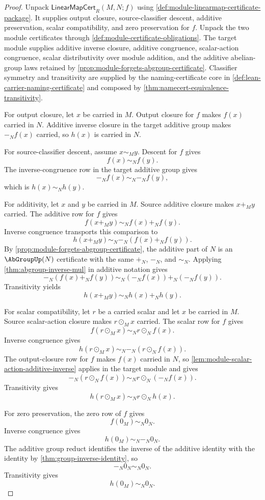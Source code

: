 \begin{proof}
Unpack $\mathsf{LinearMapCert}_R(M,N;f)$ using \autoref{def:module-linearmap-certificate-package}. It supplies output closure, source-classifier descent, additive preservation, scalar compatibility, and zero preservation for $f$. Unpack the two module certificates through \autoref{def:module-certificate-obligations}. The target module supplies additive inverse closure, additive congruence, scalar-action congruence, scalar distributivity over module addition, and the additive abelian-group laws retained by \autoref{prop:module-forgets-abgroup-certificate}. Classifier symmetry and transitivity are supplied by the naming-certificate core in \autoref{def:lean-carrier-naming-certificate} and composed by \autoref{thm:namecert-equivalence-transitivity}.

For output closure, let $x$ be carried in $M$. Output closure for $f$ makes $f(x)$ carried in $N$. Additive inverse closure in the target additive group makes $-_N f(x)$ carried, so $h(x)$ is carried in $N$.

For source-classifier descent, assume $x\sim_M y$. Descent for $f$ gives
$$
f(x)\sim_N f(y).
$$
The inverse-congruence row in the target additive group gives
$$
-_N f(x)\sim_N-_N f(y),
$$
which is $h(x)\sim_Nh(y)$.

For additivity, let $x$ and $y$ be carried in $M$. Source additive closure makes $x+_M y$ carried. The additive row for $f$ gives
$$
f(x+_M y)\sim_N f(x)+_N f(y).
$$
Inverse congruence transports this comparison to
$$
h(x+_M y)\sim_N-_N(f(x)+_N f(y)).
$$
By \autoref{prop:module-forgets-abgroup-certificate}, the additive part of $N$ is an $\AbGroupUp(N)$ certificate with the same $+_N$, $-_N$, and $\sim_N$. Applying \autoref{thm:abgroup-inverse-mul} in additive notation gives
$$
-_N(f(x)+_N f(y))\sim_N(-_N f(x))+_N(-_N f(y)).
$$
Transitivity yields
$$
h(x+_M y)\sim_N h(x)+_N h(y).
$$

For scalar compatibility, let $r$ be a carried scalar and let $x$ be carried in $M$. Source scalar-action closure makes $r\odot_M x$ carried. The scalar row for $f$ gives
$$
f(r\odot_M x)\sim_N r\odot_N f(x).
$$
Inverse congruence gives
$$
h(r\odot_M x)\sim_N-_N(r\odot_N f(x)).
$$
The output-closure row for $f$ makes $f(x)$ carried in $N$, so \autoref{lem:module-scalar-action-additive-inverse} applies in the target module and gives
$$
-_N(r\odot_N f(x))\sim_N r\odot_N(-_N f(x)).
$$
Transitivity gives
$$
h(r\odot_M x)\sim_N r\odot_N h(x).
$$

For zero preservation, the zero row of $f$ gives
$$
f(0_M)\sim_N0_N.
$$
Inverse congruence gives
$$
h(0_M)\sim_N-_N0_N.
$$
The additive group reduct identifies the inverse of the additive identity with the identity by \autoref{thm:group-inverse-identity}, so
$$
-_N0_N\sim_N0_N.
$$
Transitivity gives
$$
h(0_M)\sim_N0_N.
$$


\end{proof}
